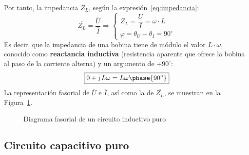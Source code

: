 Por tanto, la impedancia $\overline{Z_L}$, según la
expresión~\eqref{eq:impedancia}:
\begin{equation*}
  \overline{Z_L}=\dfrac{\overline{U}}{\overline{I}}\Rightarrow
  \begin{cases}
    Z_L=\dfrac{U}{I}=\omega\cdot L\\
    \varphi=\theta_U-\theta_I=90^\circ
  \end{cases}
\end{equation*}
Es decir, que la impedancia de una bobina tiene de módulo el valor
$L\cdot\omega$, conocido como \textbf{reactancia inductiva}
(resistencia aparente que ofrece la bobina al paso de la corriente
alterna) y un argumento de $+90^\circ$:
\begin{equation}
  \boxed{0+\mathrm{j}\,L\omega=L\omega\phase{90^\circ}}
\end{equation}
La representación fasorial de $\overline{U}$ e $\overline{I}$, así
como la de $\overline{Z_L}$, se muestran en la
Figura~\ref{fig:fasorInductancia}.
\begin{figure}[H]
  \centering {}\hfil
  \caption{Diagrama fasorial de un circuito inductivo puro}
  \label{fig:fasorInductancia}
\end{figure}
	
\subsection{Circuito capacitivo puro}\label{sec:C-puro}
	

